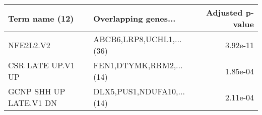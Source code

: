 \begin{tabular}{llr}
\toprule
        Term name (12) &      Overlapping genes... &  Adjusted p-value \\
\midrule
             NFE2L2.V2 &  ABCB6,LRP8,UCHL1,...(36) &          3.92e-11 \\
     CSR LATE UP.V1 UP &   FEN1,DTYMK,RRM2,...(14) &          1.85e-04 \\
GCNP SHH UP LATE.V1 DN & DLX5,PUS1,NDUFA10,...(14) &          2.11e-04 \\
\bottomrule
\end{tabular}
